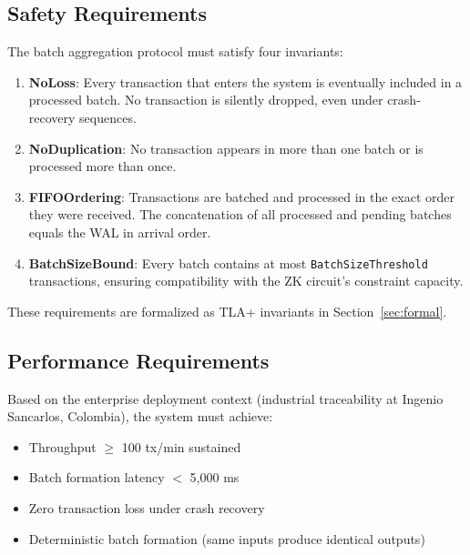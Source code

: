 \subsection{Safety Requirements}

The batch aggregation protocol must satisfy four invariants:

\begin{enumerate}
\item \textbf{NoLoss}: Every transaction that enters the system is eventually
  included in a processed batch. No transaction is silently dropped, even under
  crash-recovery sequences.
\item \textbf{NoDuplication}: No transaction appears in more than one batch or
  is processed more than once.
\item \textbf{FIFOOrdering}: Transactions are batched and processed in the
  exact order they were received. The concatenation of all processed and pending
  batches equals the WAL in arrival order.
\item \textbf{BatchSizeBound}: Every batch contains at most
  \texttt{BatchSizeThreshold} transactions, ensuring compatibility with the
  ZK circuit's constraint capacity.
\end{enumerate}

These requirements are formalized as TLA+ invariants in Section~\ref{sec:formal}.

\subsection{Performance Requirements}

Based on the enterprise deployment context (industrial traceability at
Ingenio Sancarlos, Colombia), the system must achieve:

\begin{itemize}
\item Throughput $\geq$ 100 tx/min sustained
\item Batch formation latency $<$ 5,000 ms
\item Zero transaction loss under crash recovery
\item Deterministic batch formation (same inputs produce identical outputs)
\end{itemize}
